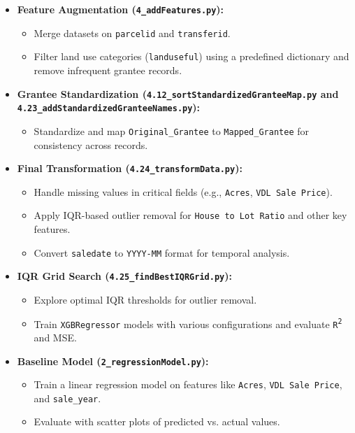 \begin{itemize}
    \item \textbf{Feature Augmentation (\texttt{4\_addFeatures.py}):}
    \begin{itemize}
        \item Merge datasets on \texttt{parcelid} and \texttt{transferid}.
        \item Filter land use categories (\texttt{landuseful}) using a predefined dictionary and remove infrequent grantee records.
    \end{itemize}

    \item \textbf{Grantee Standardization (\texttt{4.12\_sortStandardizedGranteeMap.py} and \texttt{4.23\_addStandardizedGranteeNames.py}):}
    \begin{itemize}
        \item Standardize and map \texttt{Original\_Grantee} to \texttt{Mapped\_Grantee} for consistency across records.
    \end{itemize}

    \item \textbf{Final Transformation (\texttt{4.24\_transformData.py}):}
    \begin{itemize}
        \item Handle missing values in critical fields (e.g., \texttt{Acres}, \texttt{VDL Sale Price}).
        \item Apply IQR-based outlier removal for \texttt{House to Lot Ratio} and other key features.
        \item Convert \texttt{saledate} to \texttt{YYYY-MM} format for temporal analysis.
    \end{itemize}

    \item \textbf{IQR Grid Search (\texttt{4.25\_findBestIQRGrid.py}):}
    \begin{itemize}
        \item Explore optimal IQR thresholds for outlier removal.
        \item Train \texttt{XGBRegressor} models with various configurations and evaluate \texttt{R\textsuperscript{2}} and MSE.
    \end{itemize}

    \item \textbf{Baseline Model (\texttt{2\_regressionModel.py}):}
    \begin{itemize}
        \item Train a linear regression model on features like \texttt{Acres}, \texttt{VDL Sale Price}, and \texttt{sale\_year}.
        \item Evaluate with scatter plots of predicted vs. actual values.
    \end{itemize}


\end{itemize}
